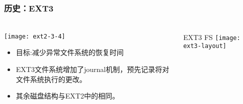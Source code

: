 \begin{frame}[fragile]
	\frametitle{历史：EXT3}
	
	\frametitle{ }
	\begin{columns}[t]
		\begin{column}{.4\textwidth}
			
			\texttt{[image: ext2-3-4]}
			\begin{itemize}
				\item 目标:减少异常文件系统的恢复时间
				\item EXT3文件系统增加了journal机制，预先记录将对文件系统执行的更改。
				\item 其余磁盘结构与EXT2中的相同。
				
			\end{itemize}
			
		\end{column}
		
		\begin{column}{.5\textwidth}			
			EXT3 FS
			\texttt{[image: ext3-layout]}
			
		\end{column}
	\end{columns}
	
\end{frame}


